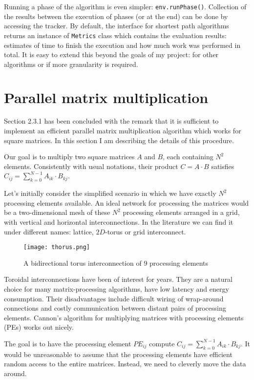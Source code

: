\documentclass[12pt,a4paper,oneside,openright]{report}
\begin{document}
Running a phase of the algorithm is even simpler: \texttt{env.runPhase()}. Collection of the results between the execution of phases (or at the end) can be done by accessing the tracker. By default, the interface for shortest path algorithms returns an instance of \texttt{Metrics} class which contains the evaluation results: estimates of time to finish the execution and how much work was performed in total. It is easy to extend this beyond the goals of my project: for other algorithms or if more granularity is required. 

\section{Parallel matrix multiplication}
Section 2.3.1 has been concluded with the remark that it is sufficient to implement an efficient parallel matrix multiplication algorithm which works for square matrices. In this section I am describing the details of this procedure.

Our goal is to multiply two square matrices $A$ and $B$, each containing $N^2$ elements. Consistently with usual notations, their product $C=A\cdot B$ satisfies $C_{ij} = \sum_{k=0}^{N-1} A_{ik}\cdot B_{kj}$. 

Let's initially consider the simplified scenario in which we have exactly $N^2$ processing elements available. An ideal network for processing the matrices would be a two-dimensional mesh of these $N^2$ processing elements arranged in a grid, with vertical and horizontal interconnections. In the literature we can find it under different names: lattice, $2D$-torus or grid interconnect. 

\begin{figure}[h]
\centering
\texttt{[image: thorus.png]}
\caption{A bidirectional torus interconnection of $9$ processing elements}
\end{figure}

Toroidal interconnections have been of interest for years. They are a natural choice for many matrix-processing algorithms, have low latency and energy consumption. Their disadvantages include difficult wiring of wrap-around connections and costly communication between distant pairs of processing elements. Cannon's algorithm\cite{cannon} for multiplying matrices with processing elements (PEs) works out nicely.

The goal is to have the processing element $PE_{ij}$ compute $C_{ij}=\sum_{k=0}^{N-1} A_{ik}\cdot B_{kj}$. It would be unreasonable to assume that the processing elements have efficient random access to the entire matrices. Instead, we need to cleverly move the data around.
\end{document}
